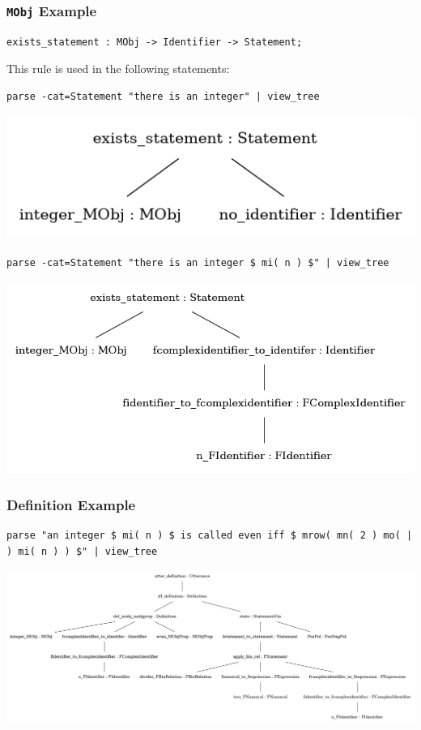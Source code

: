 \documentclass{beamer}
\begin{document}
\begin{frame}[fragile]
    \frametitle{\lstinline[language=GF]{MObj} Example}
    \vspace{1em}
\begin{lstlisting}[language=GF, breaklines=true]
exists_statement : MObj -> Identifier -> Statement;
\end{lstlisting}

    \vspace{1em}
    This rule is used in the following statements:

    \vspace{1em}
\begin{lstlisting}[language=GFcmd, breaklines=true]
parse -cat=Statement "there is an integer" | view_tree
\end{lstlisting}
    \includegraphics[scale=0.3]{exists_noid.png}
\begin{lstlisting}[language=GFcmd, breaklines=true]
parse -cat=Statement "there is an integer $ mi( n ) $" | view_tree
\end{lstlisting}
    \includegraphics[scale=0.3]{exists_n.png}
\end{frame}


\begin{frame}[fragile]
    \frametitle{Definition Example}

    \begin{lstlisting}[language=GF, breaklines=true]
parse "an integer $ mi( n ) $ is called even iff $ mrow( mn( 2 ) mo( | ) mi( n ) ) $" | view_tree
    \end{lstlisting}
    \includegraphics[scale=0.3]{even_def.png}
\end{frame}
\end{document}
